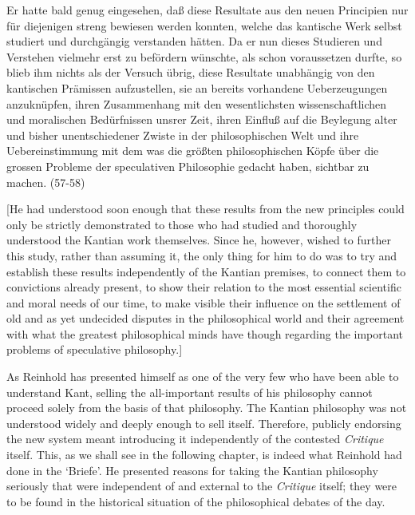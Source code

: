 Er hatte bald genug eingesehen, da\ss{} diese Resultate aus den neuen Principien nur f\"{u}r diejenigen streng bewiesen werden konnten, welche das kantische Werk selbst studiert und durchg\"{a}ngig verstanden h\"{a}tten. Da er nun dieses Studieren und Verstehen vielmehr erst zu bef\"{o}rdern w\"{u}nschte, als schon voraussetzen durfte, so blieb ihm nichts als der Versuch \"{u}brig, diese Resultate unabh\"{a}ngig von den kantischen Pr\"{a}missen aufzustellen, sie an bereits vorhandene Ueberzeugungen anzukn\"{u}pfen, ihren Zusammenhang mit den wesentlichsten wissenschaftlichen und moralischen Bed\"{u}rfnissen unsrer Zeit, ihren Einflu\ss{} auf die Beylegung alter und bisher unentschiedener Zwiste in der philosophischen Welt und ihre Uebereinstimmung mit dem was die gr\"{o}\ss{}ten philosophischen K\"{o}pfe \"{u}ber die grossen Probleme der speculativen Philosophie gedacht haben, sichtbar zu machen. (57{-}58)

[He had understood soon enough that these results from the new principles could only be strictly demonstrated to those who had studied and thoroughly understood the Kantian work themselves. Since he, however, wished to further this study, rather than assuming it, the only thing for him to do was to try and establish these results independently of the Kantian premises, to connect them to convictions already present, to show their relation to the most essential scientific and moral needs of our time, to make visible their influence on the settlement of old and as yet undecided disputes in the philosophical world and their agreement with what the greatest philosophical minds have though regarding the important problems of speculative philosophy.] 

As Reinhold has presented himself as one of the very few who have been able to understand Kant, selling the all{-}important results of his philosophy cannot proceed solely from the basis of that philosophy. The Kantian philosophy was not understood widely and deeply enough to sell itself. Therefore, publicly endorsing the new system meant introducing it independently of the contested \textit{Critique} itself. This, as we shall see in the following chapter, is indeed what Reinhold had done in the `Briefe'. He presented reasons for taking the Kantian philosophy seriously that were independent of and external to the \textit{Critique }itself; they were to be found in the historical situation of the philosophical debates of the day. 

